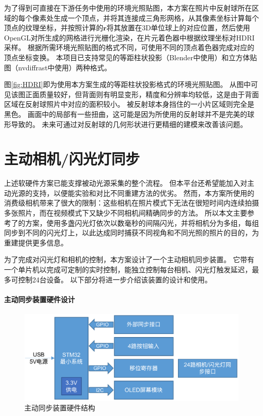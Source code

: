 为了得到可直接在下游任务中使用的环境光照贴图，本方案在照片中反射球所在区域的每个像素处生成一个顶点，并将其连接成三角形网格，从其像素坐标计算每个顶点的纹理坐标，并按照计算的$\mathbf{r}$将其放置在3D单位球上的对应位置，然后使用OpenGL对所生成的网格进行光栅化渲染，在片元着色器中根据纹理坐标对HDRI采样。
根据所需环境光照贴图的格式不同，可使用不同的顶点着色器完成对应的顶点坐标变换。
本项目已支持常见的等距柱状投影（Blender中使用）和立方体贴图（nvdiffrast中使用）两种格式。

图\ref{fig:HDRI}即为使用本方案生成的等距柱状投影格式的环境光照贴图。
从图中可见该图正面质量较好，但背面则有明显变形，精度和分辨率均较低，这是由于背面区域在反射球照片中对应的面积较小。
被反射球本身挡住的一小片区域则完全是黑色。
画面中的局部有一些扭曲，这可能是因为所使用的反射球并不是完美的球形导致的。
未来可通过对反射球的几何形状进行更精细的建模来改善该问题。

\section{主动相机/闪光灯同步}

上述软硬件方案已能支撑被动光源采集的整个流程。
但本平台还希望能加入对主动光源的支持，以便能实验和对比不同重建方法的优劣。
然而，本方案所使用的消费级相机带来了很大的限制：这些相机在照片模式下无法在很短时间内连续拍摄多张照片，而在视频模式下又缺少不同相机间精确同步的方法。
所以本文主要参考了\citet{FyffeGTGD16}的方案，使用多盏闪光灯依次以数毫秒的间隔闪光，并将相机分为多组，每组同步到不同的闪光灯上，以此达成同时捕获不同视角和不同光照的照片的目的，为重建提供更多信息。

为了完成对闪光灯和相机的控制，本方案设计了一个主动相机同步装置。
它带有一个单片机以完成可定制的实时控制，能独立控制每台相机、闪光灯触发延迟，最多可控制24台设备。
以下部分将进一步介绍该装置的设计和使用。

\paragraph{主动同步装置硬件设计}

\begin{figure}
\centering
\includegraphics[width=0.8\linewidth]{figures/active_sync.png}
\caption{主动同步装置硬件结构}
\label{fig:active_sync}
\end{figure}

